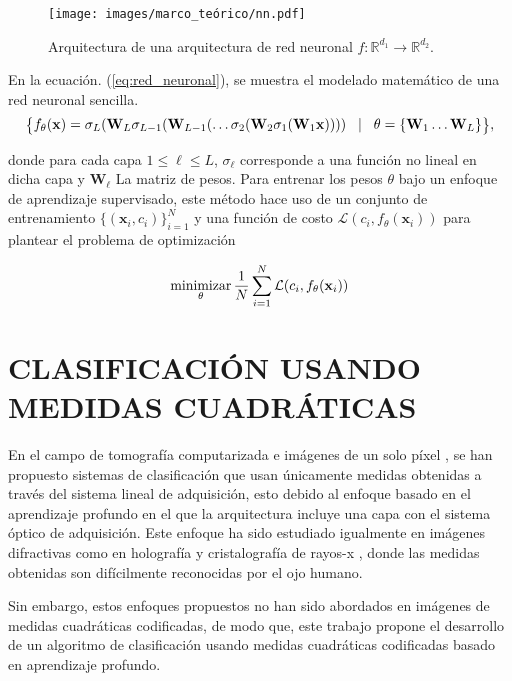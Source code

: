 \begin{figure}[H]
    \centering
    \texttt{[image: images/marco\_teórico/nn.pdf]}
    \caption{\hspace{2mm}Arquitectura de una arquitectura de red neuronal $f: \mathbb{R}^{d_1} \rightarrow \mathbb{R}^{d_2}$.}
    \label{fig:nn}
\end{figure}

En la ecuación. (\ref{eq:red_neuronal}), se muestra el modelado matemático de una red neuronal sencilla. 
\begin{equation}
    \footnotesize 
    \big\{f_\theta(\mathbf{x}) = \sigma_{L}(\mathbf{W}_{L}\sigma_{L-1}(\mathbf{W}_{L-1} (\dots \sigma_2(\mathbf{W}_2\sigma_1(\mathbf{W}_1\mathbf{x})))) \quad \vert \quad\theta = \{\mathbf{W}_{1} \dots \mathbf{W}_{L}\}  \big\},
    \label{eq:red_neuronal}
\end{equation}

donde para cada capa $1 \leq \ell \leq L$, $\sigma_\ell$ corresponde a una función no lineal en dicha capa y $\mathbf{W}_\ell$ La matriz de pesos. Para entrenar los pesos $\theta$ bajo un enfoque de aprendizaje supervisado, este método hace uso de un conjunto de entrenamiento $\{(\mathbf{x}_i, c_i) \}_{i=1}^{N}$ y una función de costo $\mathcal{L}( c_i,  f_\theta(\mathbf{x}_i))$ para plantear el problema de optimización 

\begin{equation}
    \operatorname*{minimizar}_\theta \frac{1}{N}\sum_{i=1}^{N} \mathcal{L}( c_i,  f_\theta(\mathbf{x}_i))
    \label{eq:optimización_nn}
\end{equation}

\section{CLASIFICACIÓN USANDO MEDIDAS CUADRÁTICAS}
En el campo de tomografía computarizada  e imágenes de un solo píxel , se han propuesto sistemas de clasificación que usan únicamente medidas obtenidas a través del sistema lineal de adquisición, esto debido al enfoque basado en el aprendizaje profundo en el que la arquitectura incluye una capa con el sistema óptico de adquisición. Este enfoque ha sido estudiado igualmente en imágenes difractivas como en holografía  y cristalografía de rayos-x , donde las medidas obtenidas son difícilmente reconocidas por el ojo humano. 

Sin embargo, estos enfoques propuestos no han sido abordados en imágenes de medidas cuadráticas codificadas, de modo que, este trabajo propone el desarrollo de un algoritmo de clasificación usando medidas cuadráticas codificadas basado en aprendizaje profundo. 


